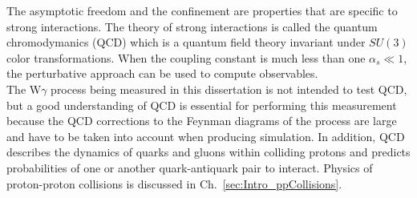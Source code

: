 The asymptotic freedom and the confinement are properties that are specific to strong interactions. The theory of strong interactions is called the quantum chromodymanics (QCD) which is a quantum field theory invariant under $SU(3)$ color transformations. When the coupling constant is much less than one $\alpha_s \ll 1$, the perturbative approach can be used to compute observables.\\

The W$\gamma$ process being measured in this dissertation is not intended to test QCD, but a good understanding of QCD is essential for performing this measurement because the QCD corrections to the Feynman diagrams of the process are large and have to be taken into account when producing simulation. In addition, QCD describes the dynamics of quarks and gluons within colliding protons and predicts probabilities of one or another quark-antiquark pair to interact. Physics of proton-proton collisions is discussed in Ch.~\ref{sec:Intro_ppCollisions}. \\

